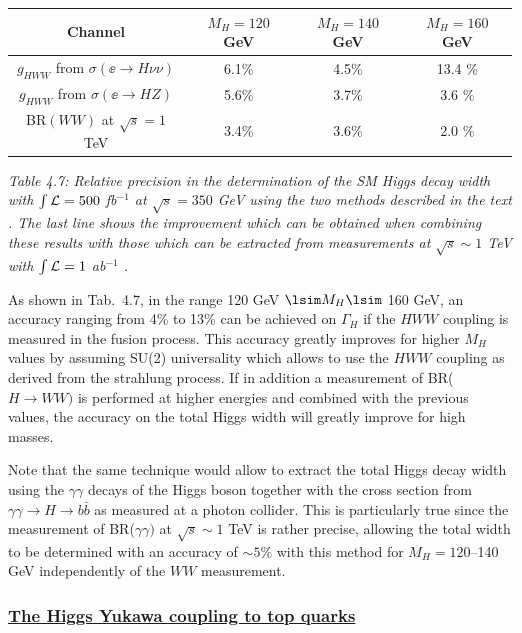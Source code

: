 \begin{table}[hbt]
\renewcommand{\arraystretch}{1.2}
\begin{center}
\begin{tabular}{|c|c|c|c|}
\hline
Channel & $M_H=120$ GeV & $M_H=140$ GeV & $M_H=160$ GeV \\ \hline
$g_{HWW}$ from $\sigma(\ee \to H \nu \nu)$& 6.1\% & 4.5\% & 13.4 \%  \\ 
$g_{HWW}$ from $\sigma(\ee \to H Z)      $ & 5.6\% & 3.7\% & 3.6 \%  \\ 
\hline \hline
BR$(WW)$ at $\sqrt{s}=1$ TeV & 3.4\% & 3.6\% & 2.0 \%  \\ \hline
\end{tabular}
\end{center}
{\it Table 4.7: Relative precision in the determination of the SM Higgs decay 
width with $\int {\cal L}=500$ fb$^{-1}$ at $\sqrt{s} = 350$ GeV using
the two methods described in the text \cite{TESLA}. The last line shows the 
improvement which can be obtained when combining these results with those
which can be extracted from measurements at $\sqrt{s}\sim 1$ TeV with $\int 
{\cal L}=1$ ab$^{-1}$ \cite{Barklow}.}
\vspace{-.3cm}
\end{table}

As shown in Tab.~4.7, in the range 120 GeV $\lsim M_H \lsim$ 160 GeV, an 
accuracy  ranging from 4\% to 13\% can be achieved on $\Gamma_H$ if the
$HWW$ coupling is measured in the fusion process. This accuracy greatly
improves for higher $M_H$ values by assuming SU(2) universality which
allows to use the $HWW$ coupling as derived from the strahlung process.
If in addition a measurement of BR($H\to WW)$ is performed at higher energies
and combined with the previous values, the accuracy on the total Higgs width 
will greatly improve for high masses.\s

Note that the same technique would allow to extract the total Higgs decay 
width using the $\gamma \gamma$ decays of the Higgs boson together with 
the cross section from $\gamma \gamma \to H \to b\bar b$ as measured at a 
photon collider. This is particularly true since the measurement of BR($\gamma 
\gamma)$ at $\sqrt s \sim 1$ TeV is rather precise, allowing the total width 
to be determined with an accuracy of $\sim 5\%$ with this method for
$M_H=120$--140 GeV independently of the $WW$ measurement.


\vspace*{-.2cm}
\subsubsection*{\underline{The Higgs Yukawa coupling to top quarks}}

